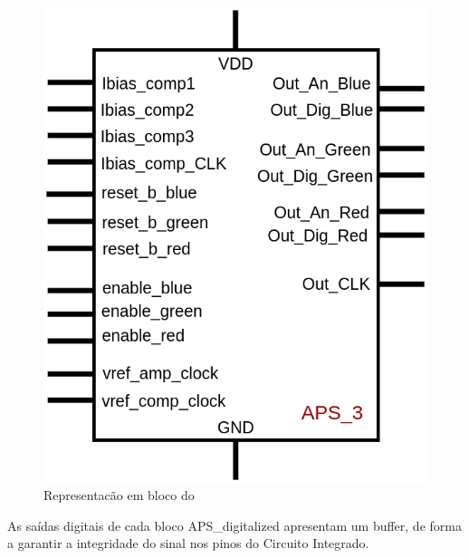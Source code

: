 \begin{figure}[htb]
 \centering
    \centering
    \caption{Representacão em bloco do \NomeBloco} \label{\NomeSFig}
    \includegraphics[scale=0.3]{Circuitos/APS_3_block.png}
\end{figure}

As sa\'idas digitais de cada bloco APS\_digitalized apresentam um buffer, de forma a garantir a integridade do sinal nos pinos do Circuito Integrado.

